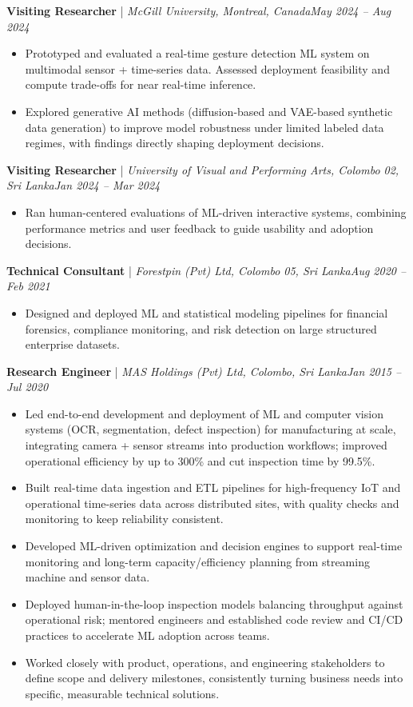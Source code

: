 \documentclass[11pt]{article}
\newenvironment{cvrole}[5]{%
  \par\noindent\textbf{\large #1} | \textit{\small #2, #3}\hfill \textit{\small #4 -- #5}\par
  \begin{itemize}[leftmargin=2em, itemsep=-0.3em, topsep=-0.5em]%
}{%
  \end{itemize}\par\noindent\mbox{}\par\vspace{0.1em}%
}
\begin{document}
\begin{cvrole}{Visiting Researcher}{McGill University}{Montreal, Canada}{May 2024}{Aug 2024}
    \item Prototyped and evaluated a real-time gesture detection ML system on multimodal sensor + time-series data. Assessed deployment feasibility and compute trade-offs for near real-time inference.
    \item Explored generative AI methods (diffusion-based and VAE-based synthetic data generation) to improve model robustness under limited labeled data regimes, with findings directly shaping deployment decisions.
\end{cvrole}

\begin{cvrole}{Visiting Researcher}{University of Visual and Performing Arts}{Colombo 02, Sri Lanka}{Jan 2024}{Mar 2024}
    \item Ran human-centered evaluations of ML-driven interactive systems, combining performance metrics and user feedback to guide usability and adoption decisions.
\end{cvrole}

\begin{cvrole}{Technical Consultant}{Forestpin (Pvt) Ltd}{Colombo 05, Sri Lanka}{Aug 2020}{Feb 2021}
    \item Designed and deployed ML and statistical modeling pipelines for financial forensics, compliance monitoring, and risk detection on large structured enterprise datasets.
\end{cvrole}

\begin{cvrole}{Research Engineer}{MAS Holdings (Pvt) Ltd}{Colombo, Sri Lanka}{Jan 2015}{Jul 2020}
    \item Led end-to-end development and deployment of ML and computer vision systems (OCR, segmentation, defect inspection) for manufacturing at scale, integrating camera + sensor streams into production workflows; improved operational efficiency by up to 300\% and cut inspection time by 99.5\%.
    \item Built real-time data ingestion and ETL pipelines for high-frequency IoT and operational time-series data across distributed sites, with quality checks and monitoring to keep reliability consistent.
    \item Developed ML-driven optimization and decision engines to support real-time monitoring and long-term capacity/efficiency planning from streaming machine and sensor data.
    \item Deployed human-in-the-loop inspection models balancing throughput against operational risk; mentored engineers and established code review and CI/CD practices to accelerate ML adoption across teams.
    \item Worked closely with product, operations, and engineering stakeholders to define scope and delivery milestones, consistently turning business needs into specific, measurable technical solutions.
\end{cvrole}
\end{document}
